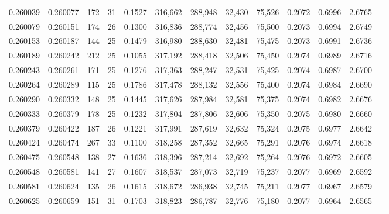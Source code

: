 \begin{tabular}{rrrrrrrrrrrrr}
0.260039 & 0.260077 &   172 &  31 &                                     0.1527 & 316,662 & 288,948 &  32,430 &  75,526 & 0.2072 & 0.6996 & 2.6765 \\
0.260079 & 0.260151 &   174 &  26 &                                     0.1300 & 316,836 & 288,774 &  32,456 &  75,500 & 0.2073 & 0.6994 & 2.6749 \\
0.260153 & 0.260187 &   144 &  25 &                                     0.1479 & 316,980 & 288,630 &  32,481 &  75,475 & 0.2073 & 0.6991 & 2.6736 \\
0.260189 & 0.260242 &   212 &  25 &                                     0.1055 & 317,192 & 288,418 &  32,506 &  75,450 & 0.2074 & 0.6989 & 2.6716 \\
0.260243 & 0.260261 &   171 &  25 &                                     0.1276 & 317,363 & 288,247 &  32,531 &  75,425 & 0.2074 & 0.6987 & 2.6700 \\
0.260264 & 0.260289 &   115 &  25 &                                     0.1786 & 317,478 & 288,132 &  32,556 &  75,400 & 0.2074 & 0.6984 & 2.6690 \\
0.260290 & 0.260332 &   148 &  25 &                                     0.1445 & 317,626 & 287,984 &  32,581 &  75,375 & 0.2074 & 0.6982 & 2.6676 \\
0.260333 & 0.260379 &   178 &  25 &                                     0.1232 & 317,804 & 287,806 &  32,606 &  75,350 & 0.2075 & 0.6980 & 2.6660 \\
0.260379 & 0.260422 &   187 &  26 &                                     0.1221 & 317,991 & 287,619 &  32,632 &  75,324 & 0.2075 & 0.6977 & 2.6642 \\
0.260424 & 0.260474 &   267 &  33 &                                     0.1100 & 318,258 & 287,352 &  32,665 &  75,291 & 0.2076 & 0.6974 & 2.6618 \\
0.260475 & 0.260548 &   138 &  27 &                                     0.1636 & 318,396 & 287,214 &  32,692 &  75,264 & 0.2076 & 0.6972 & 2.6605 \\
0.260548 & 0.260581 &   141 &  27 &                                     0.1607 & 318,537 & 287,073 &  32,719 &  75,237 & 0.2077 & 0.6969 & 2.6592 \\
0.260581 & 0.260624 &   135 &  26 &                                     0.1615 & 318,672 & 286,938 &  32,745 &  75,211 & 0.2077 & 0.6967 & 2.6579 \\
0.260625 & 0.260659 &   151 &  31 &                                     0.1703 & 318,823 & 286,787 &  32,776 &  75,180 & 0.2077 & 0.6964 & 2.6565 \\

\end{tabular}
